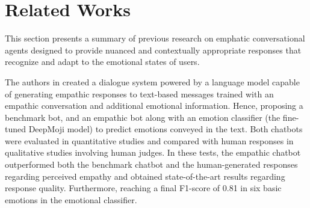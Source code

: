 \documentclass[runningheads]{llncs}
\begin{document}
%

\section{Related Works}
\label{sec:relatedwork}

This section presents a summary of previous research on emphatic conversational agents designed to provide nuanced and contextually appropriate responses that recognize and adapt to the emotional states of users.

The authors in \cite{casas_enhancing_2021} created a dialogue system powered by a language model capable of generating empathic responses to text-based messages trained with an empathic conversation and additional emotional information. Hence, proposing a benchmark bot, and an empathic bot along with an emotion classifier (the fine-tuned DeepMoji model) to predict emotions conveyed in the text. Both chatbots were evaluated in quantitative studies and compared with human responses in qualitative studies involving human judges. In these tests, the empathic chatbot outperformed both the benchmark chatbot and the human-generated responses regarding perceived empathy and obtained state-of-the-art results regarding response quality. Furthermore, reaching a final F1-score of 0.81 in six basic emotions in the emotional classifier.
\end{document}
